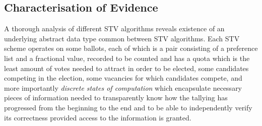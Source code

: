 \documentclass[10pt,conference]{IEEEtran}
\begin{document}



\subsection{Characterisation of Evidence}
A thorough analysis of different STV algorithms reveals existence of an underlying abstract data type common between STV algorithms. Each STV scheme operates on some ballots, each of which is a pair consisting of a preference list and a fractional value, recorded to be counted and has a quota which is the least amount of votes needed to attract in order to be elected, some candidates competing in the election, some vacancies for which candidates compete, and more importantly \emph{discrete states of computation} which encapsulate necessary  pieces of information needed to transparently know how the tallying has progressed from the beginning to the end and to be able to independently verify its correctness provided access to the information is granted. 
\end{document}
